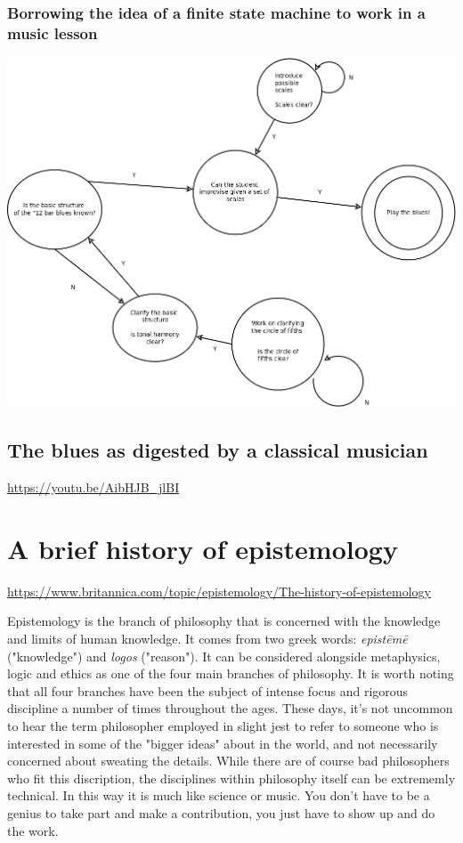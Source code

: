 \documentclass[11pt]{article}
\begin{document}
\subsubsection{Borrowing the idea of a finite state machine to work in a music lesson}
\label{sec:org778971e}

\begin{center}
\includegraphics[width=.9\linewidth]{../img/blues_flowEng.png}
\end{center}


\subsection{The blues as digested by a classical musician}
\label{sec:org69f6322}
\url{https://youtu.be/AibHJB\_jlBI}


\section{A brief history of epistemology}
\label{sec:orgcbf100e}

\url{https://www.britannica.com/topic/epistemology/The-history-of-epistemology  }

Epistemology is the branch of philosophy that is concerned with the
knowledge and limits of human knowledge. It comes from two greek
words: \emph{epistēmē} ("knowledge") and \emph{logos} ("reason"). It can be
considered alongside metaphysics, logic and ethics as one of the four
main branches of philosophy. It is worth noting that all four branches
have been the subject of intense focus and rigorous discipline a
number of times throughout the ages. These days, it's not uncommon to
hear the term philosopher employed in slight jest to refer to someone
who is interested in some of the "bigger ideas" about in the world,
and not necessarily concerned about  sweating the details. While there
are of course bad philosophers who fit this discription, the
disciplines within philosophy itself can be extrememly technical. In
this way it is much like science or music. You don't have to be a
genius to take part and make a contribution, you just have to show up
and do the work. 
\end{document}

